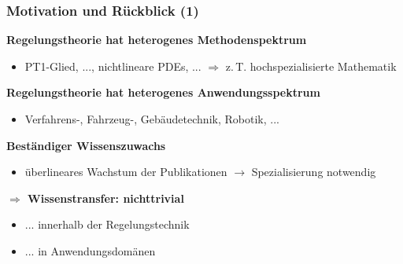 \documentclass[
	ngerman,
	10pt,				%
	aspectratio=169 	%
]{beamer}
\begin{document}
\begin{frame}[label=ef1]
  \frametitle{\large Motivation und Rückblick (1)}
  
  \textbf{Regelungstheorie hat heterogenes Methodenspektrum}
  \begin{itemize}
    \item PT1-Glied, ..., nichtlineare PDEs, ... \pause $\Rightarrow$ z.\,T. hochspezialisierte Mathematik

  \end{itemize}
  \pause
  \bigskip
  \textbf{Regelungstheorie hat heterogenes Anwendungsspektrum}
  \begin{itemize}
   \item Verfahrens-, Fahrzeug-, Gebäudetechnik, Robotik, ...
  \end{itemize}

  \bigskip
  \textbf{Beständiger Wissenszuwachs}
  \begin{itemize}
   \item überlineares Wachstum der Publikationen $\rightarrow$ Spezialisierung notwendig
  \end{itemize}

  \pause
  \bigskip
  \textbf{$\Rightarrow$ Wissenstransfer: nichttrivial}
  \begin{itemize}
   \item ... innerhalb der Regelungstechnik  
   \item ... in Anwendungsdomänen
  \end{itemize}

\end{frame}
\end{document}
